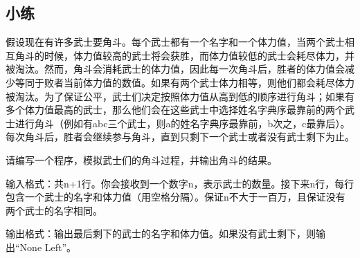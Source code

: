 \subsection{小练}

\begin{example}
  假设现在有许多武士要角斗。每个武士都有一个名字和一个体力值，当两个武士相互角斗的时候，体力值较高的武士将会获胜，而体力值较低的武士会耗尽体力，并被淘汰。然而，角斗会消耗武士的体力值，因此每一次角斗后，胜者的体力值会减少等同于败者当前体力值的数值。如果有两个武士体力相等，则他们都会耗尽体力被淘汰。为了保证公平，武士们决定按照体力值从高到低的顺序进行角斗；如果有多个体力值最高的武士，那么他们会在这些武士中选择姓名字典序最靠前的两个武士进行角斗（例如有abc三个武士，则a的姓名字典序最靠前，b次之，c最靠后）。每次角斗后，胜者会继续参与角斗，直到只剩下一个武士或者没有武士剩下为止。

  请编写一个程序，模拟武士们的角斗过程，并输出角斗的结果。

  输入格式：共n+1行。你会接收到一个数字n，表示武士的数量。接下来n行，每行包含一个武士的名字和体力值（用空格分隔）。保证n不大于一百万，且保证没有两个武士的名字相同。

  输出格式：输出最后剩下的武士的名字和体力值。如果没有武士剩下，则输出“None Left”。
\end{example}

